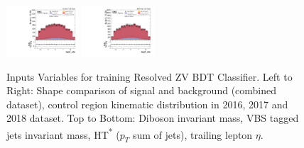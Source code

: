 \begin{figure}[!ht]
  \includegraphics[width=0.24\textwidth]{analysis_plots/2017_zjj/cr_vjets_l/lep2_eta.pdf}
  \includegraphics[width=0.24\textwidth]{analysis_plots/2018_zjj/cr_vjets_l/lep2_eta.pdf}
  \caption[Inputs Variables for training Resolved ZV BDT Classifier]%
  {Inputs Variables for training Resolved ZV BDT Classifier.
    Left to Right: Shape comparison of signal and background (combined dataset), control region
    kinematic distribution in 2016, 2017 and 2018 dataset.
    Top to Bottom: Diboson invariant mass, VBS tagged jets invariant mass,
    HT\textsuperscript{*} (\( p_{T} \) sum of jets), trailing lepton \( \eta \).}%
  \label{fig:vbs-training-input-zjj}
\end{figure}

